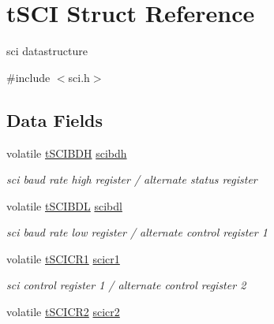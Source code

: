 \hypertarget{structt_s_c_i}{}\section{t\+S\+C\+I Struct Reference}
\label{structt_s_c_i}


sci datastructure  




{\ttfamily \#include $<$sci.\+h$>$}

\subsection*{Data Fields}
\begin{DoxyCompactItemize}
\item 
\hypertarget{structt_s_c_i_a967b6e4a13717e6327bc03f2d3484825}{}volatile \hyperlink{unionu_s_c_i_b_d_h}{t\+S\+C\+I\+B\+D\+H} \hyperlink{structt_s_c_i_a967b6e4a13717e6327bc03f2d3484825}{scibdh}\label{structt_s_c_i_a967b6e4a13717e6327bc03f2d3484825}

\begin{DoxyCompactList}\small\item\em sci baud rate high register / alternate status register \end{DoxyCompactList}\item 
\hypertarget{structt_s_c_i_ab8f9888095bfb52f0a4d12e48b61ffe8}{}volatile \hyperlink{unionu_s_c_i_b_d_l}{t\+S\+C\+I\+B\+D\+L} \hyperlink{structt_s_c_i_ab8f9888095bfb52f0a4d12e48b61ffe8}{scibdl}\label{structt_s_c_i_ab8f9888095bfb52f0a4d12e48b61ffe8}

\begin{DoxyCompactList}\small\item\em sci baud rate low register / alternate control register 1 \end{DoxyCompactList}\item 
\hypertarget{structt_s_c_i_aedb58b62e445dc7779a6e6a9c22f5821}{}volatile \hyperlink{unionu_s_c_i_c_r1}{t\+S\+C\+I\+C\+R1} \hyperlink{structt_s_c_i_aedb58b62e445dc7779a6e6a9c22f5821}{scicr1}\label{structt_s_c_i_aedb58b62e445dc7779a6e6a9c22f5821}

\begin{DoxyCompactList}\small\item\em sci control register 1 / alternate control register 2 \end{DoxyCompactList}\item 
\hypertarget{structt_s_c_i_ac22b2850ac26c6a74a2575a954844173}{}volatile \hyperlink{unionu_s_c_i_c_r2}{t\+S\+C\+I\+C\+R2} \hyperlink{structt_s_c_i_ac22b2850ac26c6a74a2575a954844173}{scicr2}\label{structt_s_c_i_ac22b2850ac26c6a74a2575a954844173}


\end{DoxyCompactItemize}
